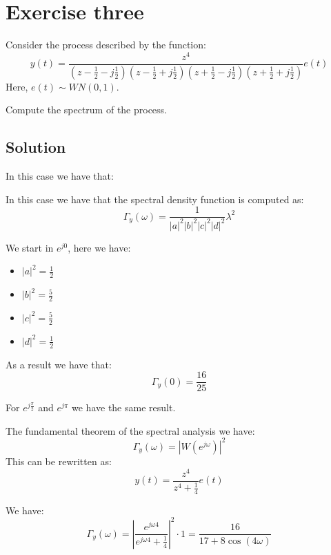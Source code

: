 \section{Exercise three}

Consider the process described by the function: 
\[y(t)=\dfrac{z^4}{\left(z-\frac{1}{2}-j\frac{1}{2}\right)\left(z-\frac{1}{2}+j\frac{1}{2}\right)\left(z+\frac{1}{2}-j\frac{1}{2}\right)\left(z+\frac{1}{2}+j\frac{1}{2}\right)}e(t)\]
Here, $e(t) \sim WN(0,1)$. 

Compute the spectrum of the process. 

\subsection{Solution}
In this case we have that: 

In this case we have that the spectral density function is computed as: 
\[\Gamma_y(\omega)=\dfrac{1}{\left\lvert a \right\rvert^2\left\lvert b \right\rvert^2\left\lvert c \right\rvert^2\left\lvert d \right\rvert^2}\lambda^2\]

We start in $e^{j0}$, here we have: 
\begin{itemize}
    \item $\left\lvert a \right\rvert^2=\frac{1}{2}$
    \item $\left\lvert b \right\rvert^2=\frac{5}{2}$
    \item $\left\lvert c \right\rvert^2=\frac{5}{2}$
    \item $\left\lvert d \right\rvert^2=\frac{1}{2}$
\end{itemize}
As a result we have that: 
\[\Gamma_y(0)=\dfrac{16}{25}\]

For $e^{j\frac{\pi}{2}}$ and $e^{j\pi}$ we have the same result. 

The fundamental theorem of the spectral analysis we have: 
\[\Gamma_y(\omega)=\left\lvert W(e^{j\omega})\right\rvert^2\]
This can be rewritten as: 
\[y(t)=\dfrac{z^4}{z^4+\frac{1}{4}}e(t)\]

We have: 
\[\Gamma_y(\omega)=\left\lvert \dfrac{e^{j\omega 4}}{e^{j\omega 4}+\frac{1}{4}}\right\rvert^2 \cdot 1=\dfrac{16}{17+8\cos(4\omega)}\]
